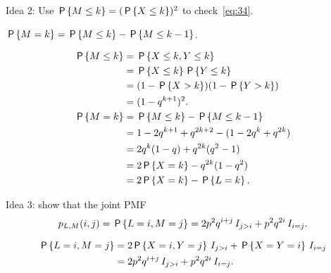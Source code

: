 \documentclass[a4paper,12pt]{article}
\begin{document}
\begin{exercise}
Idea 2: Use  $\P{M\leq k} = (\P{X\leq k})^{2}$  to check~\cref{eq:34}.
\begin{hint}
$\P{M=k} = \P{M\leq k} - \P{M\leq k-1}$.
\end{hint}
\begin{solution}
  \begin{align}
    \label{eq:16}
\P{M\leq k}   
&= \P{X\leq k, Y\leq k} \\
&= \P{X\leq k}\P{Y\leq k} \\
&= (1-\P{X> k})(1-\P{Y> k}) \\
&= (1-q^{k+1})^{2}.\\
\P{M=k} &= \P{M\leq k} - \P{M\leq k-1}\\
&= 1-2 q^{k+1} + q^{2k+2} - (1 - 2q^{k} + q^{2k})\\
&= 2 q^{k}(1-q) + q^{2k}(q^{2}-1) \\
&= 2 \P{X=k}  - q^{2k}(1-q^{2}) \\
&= 2 \P{X=k}  - \P{L=k}.
  \end{align}
\end{solution}
\end{exercise}


\begin{exercise}\label{ex:2}
Idea 3: show that  the  joint PMF
\begin{equation}
p_{L,M}(i,j) = \P{L=i, M=j} = 2p^{2}q^{i+j}\1{j>i}+ p^{2}q^{2i}\1{i=j}.
\end{equation}
\begin{solution}
  \begin{align}
    \label{eq:17}
\P{L=i, M=j}    
&= 2\P{X=i, Y=j}\1{j>i} + \P{X=Y=i}\1{i=j} \\
&= 2p^{2}q^{i+j}\1{j>i}+ p^{2}q^{2i}\1{i=j}.
  \end{align}
\end{solution}
\end{exercise}
\end{document}
